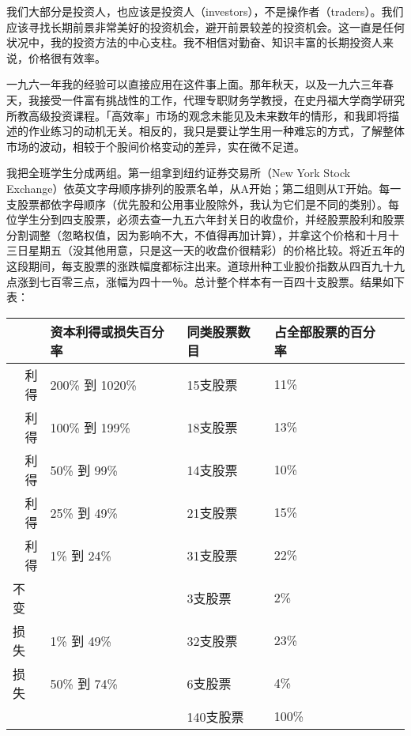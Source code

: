 \documentclass[UTF8,a4paper,zihao=-4,fontset = windows]{ctexart} %
\begin{document}
我们大部分是投资人，也应该是投资人（investors），不是操作者（traders）。我们应该寻找长期前景非常美好的投资机会，避开前景较差的投资机会。这一直是任何状况中，我的投资方法的中心支柱。我不相信对勤奋、知识丰富的长期投资人来说，价格很有效率。

一九六一年我的经验可以直接应用在这件事上面。那年秋天，以及一九六三年春天，我接受一件富有挑战性的工作，代理专职财务学教授，在史丹福大学商学研究所教高级投资课程。「高效率」市场的观念未能见及未来数年的情形，和我即将描述的作业练习的动机无关。相反的，我只是要让学生用一种难忘的方式，了解整体市场的波动，相较于个股间价格变动的差异，实在微不足道。

我把全班学生分成两组。第一组拿到纽约证券交易所（New York Stock Exchange）依英文字母顺序排列的股票名单，从A开始；第二组则从T开始。每一支股票都依字母顺序（优先股和公用事业股除外，我认为它们是不同的类别）。每位学生分到四支股票，必须去查一九五六年封关日的收盘价，并经股票股利和股票分割调整（忽略权值，因为影响不大，不值得再加计算），并拿这个价格和十月十三日星期五（没其他用意，只是这一天的收盘价很精彩）的价格比较。将近五年的这段期间，每支股票的涨跌幅度都标注出来。道琼卅种工业股价指数从四百九十九点涨到七百零三点，涨幅为四十一％。总计整个样本有一百四十支股票。结果如下表：

\begin{tabular}{lllll}
    \textbf{}              & \textbf{资本利得或损失百分率} & \textbf{同类股票数目} & \textbf{占全部股票的百分率} & \textbf{} \\
    \hline
    \multicolumn{1}{r}{利得} & 200\% 到 1020\%      & 15支股票           & 11\%               & \textbf{} \\
    \multicolumn{1}{r}{利得} & 100\% 到 199\%       & 18支股票           & 13\%               & \textbf{} \\
    \multicolumn{1}{r}{利得} & 50\% 到 99\%         & 14支股票           & 10\%               &           \\
    \multicolumn{1}{r}{利得} & 25\% 到 49\%         & 21支股票           & 15\%               &           \\
    \multicolumn{1}{r}{利得} & 1\% 到 24\%          & 31支股票           & 22\%               &           \\
    不变                     &                     & 3支股票            & 2\%                &           \\
    损失                     & 1\% 到 49\%          & 32支股票           & 23\%               &           \\
    损失                     & 50\% 到 74\%         & 6支股票            & 4\%                &           \\
    \hline
                           &                     & 140支股票          & 100\%              &          
    \end{tabular}
\end{document}
